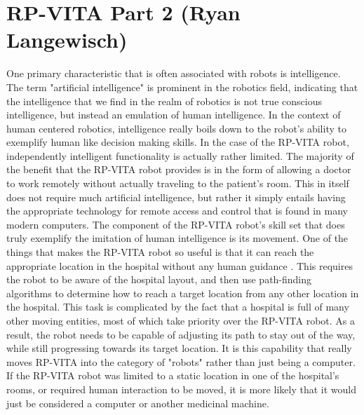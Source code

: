 \documentclass[11pt,conference]{IEEEtran}
\begin{document}
\section{RP-VITA Part 2 (Ryan Langewisch)}
One primary characteristic that is often associated with robots is intelligence. The term "artificial intelligence" is prominent in the robotics field, indicating that the intelligence that we find in the realm of robotics is not true conscious intelligence, but instead an emulation of human intelligence. In the context of human centered robotics, intelligence really boils down to the robot's ability to exemplify human like decision making skills. In the case of the RP-VITA robot, independently intelligent functionality is actually rather limited. 
\newline
\indent The majority of the benefit that the RP-VITA robot provides is in the form of allowing a doctor to work remotely without actually traveling to the patient's room. This in itself does not require much artificial intelligence, but rather it simply entails having the appropriate technology for remote access and control that is found in many modern computers. The component of the RP-VITA robot's skill set that does truly exemplify the imitation of human intelligence is its movement. One of the things that makes the RP-VITA robot so useful is that it can reach the appropriate location in the hospital without any human guidance \cite{spectrum}. This requires the robot to be aware of the hospital layout, and then use path-finding algorithms to determine how to reach a target location from any other location in the hospital. This task is complicated by the fact that a hospital is full of many other moving entities, most of which take priority over the RP-VITA robot. As a result, the robot needs to be capable of adjusting its path to stay out of the way, while still progressing towards its target location. It is this capability that really moves RP-VITA into the category of "robots" rather than just being a computer. If the RP-VITA robot was limited to a static location in one of the hospital's rooms, or required human interaction to be moved, it is more likely that it would just be considered a computer or another medicinal machine.
\newline
\end{document}
